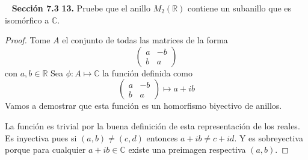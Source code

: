 \documentclass[letter,twoside,12pt]{article}
\begin{document}
\newpage
\mbox{ }
\newpage
\textbf{Secci\'on 7.3} \textbf{13.} Pruebe que el anillo $M_2(\mathbb{R})$ contiene un subanillo que es isom\'orfico a $\mathbb{C}$.
\begin{proof}
Tome $A$ el conjunto de todas las matrices de la forma
\[ \left( \begin{array}{cc}
a & -b \\
b & a \end{array} \right)\] 
con $a,b \in \mathbb{R}$
Sea $\phi:A \mapsto \mathbb{C}$ la funci\'on definida como 
\[ \left( \begin{array}{cc}
a & -b \\
b & a \end{array} \right) \mapsto a+ib\]
Vamos a demostrar que esta funci\'on es un homorfismo biyectivo de anillos.

La funci\'on es trivial por la buena definici\'on de esta representaci\'on de los reales. Es inyectiva pues si $(a,b) \not = (c,d)$ entonces $a+ib \not = c+id$. Y es sobreyectiva porque para cualquier $a+ib \in \mathbb{C}$ existe una preimagen respectiva $(a,b)$.


\end{proof}
\end{document}
